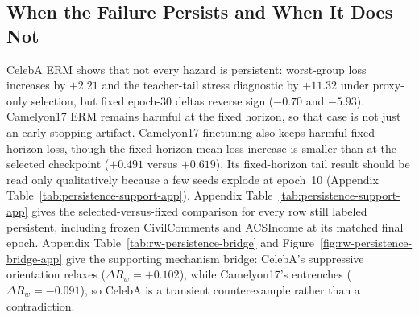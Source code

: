 \subsection{When the Failure Persists and When It Does Not}
CelebA ERM shows that not every hazard is persistent: worst-group loss increases by $+2.21$ and the teacher-tail stress diagnostic by $+11.32$ under proxy-only selection, but fixed epoch-30 deltas reverse sign ($-0.70$ and $-5.93$).
Camelyon17 ERM remains harmful at the fixed horizon, so that case is not just an early-stopping artifact.
Camelyon17 finetuning also keeps harmful fixed-horizon loss, though the fixed-horizon mean loss increase is smaller than at the selected checkpoint ($+0.491$ versus $+0.619$).
Its fixed-horizon tail result should be read only qualitatively because a few seeds explode at epoch~10 (Appendix Table~\ref{tab:persistence-support-app}).
Appendix Table~\ref{tab:persistence-support-app} gives the selected-versus-fixed comparison for every row still labeled persistent, including frozen CivilComments and ACSIncome at its matched final epoch.
Appendix Table~\ref{tab:rw-persistence-bridge} and Figure~\ref{fig:rw-persistence-bridge-app} give the supporting mechanism bridge: CelebA's suppressive orientation relaxes ($\Delta R_w=+0.102$), while Camelyon17's entrenches ($\Delta R_w=-0.091$), so CelebA is a transient counterexample rather than a contradiction.

